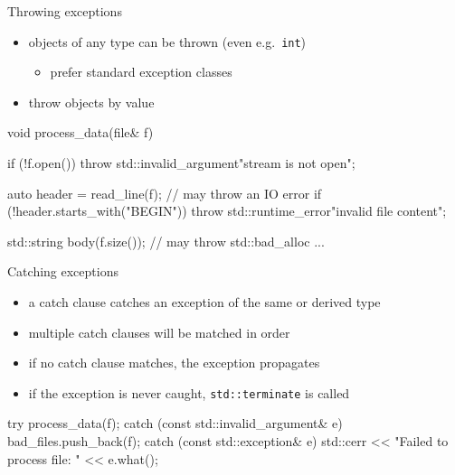 \begin{frame}[fragile]
  \begin{block}{Throwing exceptions}
    \begin{itemize}
      \item objects of any type can be thrown (even e.g.\ \texttt{int})
      \begin{itemize}
        \item prefer standard exception classes
      \end{itemize}
      \item throw objects by value
    \end{itemize}
  \end{block}
  \begin{cppcode}
    void process_data(file& f) {
      if (!f.open())
        throw std::invalid_argument{"stream is not open"};

      auto header = read_line(f); // may throw an IO error
      if (!header.starts_with("BEGIN"))
        throw std::runtime_error{"invalid file content"};

      std::string body(f.size()); // may throw std::bad_alloc
      ...
    }
  \end{cppcode}
\end{frame}

\begin{frame}[fragile]
  \begin{block}{Catching exceptions}
    \begin{itemize}
      \item a catch clause catches an exception of the same or derived type
      \item multiple catch clauses will be matched in order
      \item if no catch clause matches, the exception propagates
      \item if the exception is never caught, \texttt{std::terminate} is called
    \end{itemize}
  \end{block}
  \begin{cppcode}
    try {
      process_data(f);
    } catch (const std::invalid_argument& e) {
      bad_files.push_back(f);
    } catch (const std::exception& e) {
      std::cerr << "Failed to process file: " << e.what();
    }
  \end{cppcode}
\end{frame}

